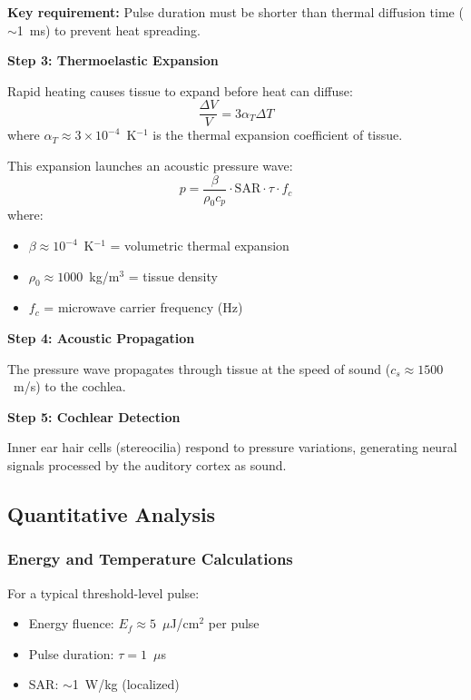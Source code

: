 \textbf{Key requirement:} Pulse duration must be shorter than thermal diffusion time ($\sim$1~ms) to prevent heat spreading.

\textbf{Step 3: Thermoelastic Expansion}

Rapid heating causes tissue to expand before heat can diffuse:
\begin{equation}
\frac{\Delta V}{V} = 3\alpha_T \Delta T
\label{eq:frey-expansion}
\end{equation}
where $\alpha_T \approx 3 \times 10^{-4}$~K$^{-1}$ is the thermal expansion coefficient of tissue.

This expansion launches an acoustic pressure wave:
\begin{equation}
p = \frac{\beta}{\rho_0 c_p} \cdot \text{SAR} \cdot \tau \cdot f_c
\label{eq:frey-pressure}
\end{equation}
where:
\begin{itemize}
\item $\beta \approx 10^{-4}$~K$^{-1}$ = volumetric thermal expansion
\item $\rho_0 \approx 1000$~kg/m$^3$ = tissue density
\item $f_c$ = microwave carrier frequency (Hz)
\end{itemize}

\textbf{Step 4: Acoustic Propagation}

The pressure wave propagates through tissue at the speed of sound ($c_s \approx 1500$~m/s) to the cochlea.

\textbf{Step 5: Cochlear Detection}

Inner ear hair cells (stereocilia) respond to pressure variations, generating neural signals processed by the auditory cortex as sound.

\subsection{Quantitative Analysis}

\subsubsection{Energy and Temperature Calculations}

For a typical threshold-level pulse:
\begin{itemize}
\item Energy fluence: $E_f \approx 5$~$\mu$J/cm$^2$ per pulse
\item Pulse duration: $\tau = 1$~$\mu$s
\item SAR: $\sim$1~W/kg (localized)
\end{itemize}


